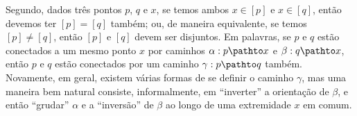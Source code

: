Segundo, dados três pontos $p$, $q$ e $x$, se temos ambos $x \in [p]$ e $x \in [q]$, então devemos ter $[p] = [q]$ também; ou, de maneira equivalente, se temos $[p] \neq [q]$, então $[p]$ e $[q]$ devem ser disjuntos. Em palavras, se $p$ e $q$ estão conectados a um mesmo ponto $x$ por caminhos $\alpha : p \pathto x$ e $\beta : q \pathto x$, então $p$ e $q$ estão conectados por um caminho $\gamma : p \pathto q$ também. Novamente, em geral, existem várias formas de se definir o caminho $\gamma$, mas uma maneira bem natural consiste, informalmente, em ``inverter'' a orientação de $\beta$, e então ``grudar'' $\alpha$ e a ``inversão'' de $\beta$ ao longo de uma extremidade $x$ em comum.

